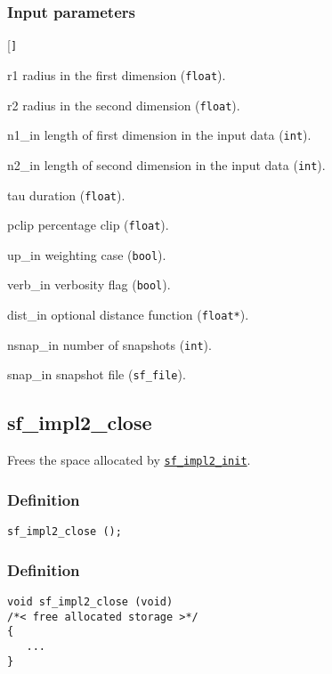 \subsubsection*{Input parameters}
\begin{desclist}{\tt }{\quad}[\tt ]
   \setlength\itemsep{0pt}
   \item[r1]        radius in the first dimension (\texttt{float}).  
   \item[r2]        radius in the second dimension (\texttt{float}).  
   \item[n1\_in]    length of first dimension in the input data (\texttt{int}).  
   \item[n2\_in]    length of second dimension in the input data (\texttt{int}).  
   \item[tau]       duration (\texttt{float}).  
   \item[pclip]     percentage clip (\texttt{float}).  
   \item[up\_in]    weighting case (\texttt{bool}).  
   \item[verb\_in]  verbosity flag (\texttt{bool}).  
   \item[dist\_in]  optional distance function (\texttt{float*}).  
   \item[nsnap\_in] number of snapshots (\texttt{int}).  
   \item[snap\_in]  snapshot file (\texttt{sf\_file}).  
\end{desclist}




\subsection{{sf\_impl2\_close}}
Frees the space allocated by \hyperref[sec:sf_impl2_init]{\texttt{sf\_impl2\_init}}.

\subsubsection*{Definition}
\begin{verbatim}sf_impl2_close ();\end{verbatim}

\subsubsection*{Definition}
\begin{verbatim}
void sf_impl2_close (void)
/*< free allocated storage >*/
{
   ...
}
\end{verbatim}




